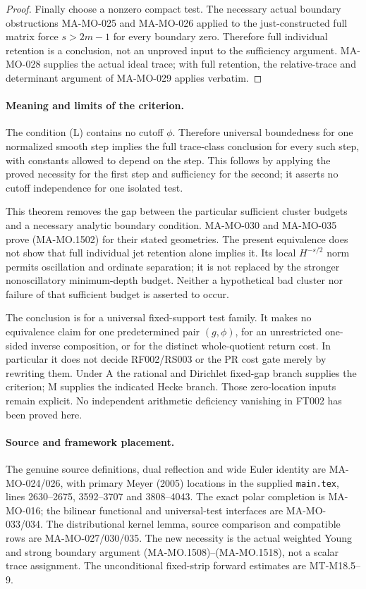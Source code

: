 \begin{proof}
Finally choose a nonzero compact test.  The necessary
actual boundary obstructions MA-MO-025 and MA-MO-026
applied to the just-constructed full matrix force
$s>2m-1$ for every boundary zero.  Therefore full individual
retention is a conclusion, not an unproved input to the
sufficiency argument.  MA-MO-028 supplies the actual ideal
trace; with full retention, the relative-trace and
determinant argument of MA-MO-029 applies verbatim.
\end{proof}

\paragraph{Meaning and limits of the criterion.}
The condition (L) contains no cutoff $\phi$.  Therefore universal
boundedness for one normalized smooth step implies the full
trace-class conclusion for every such step, with constants
allowed to depend on the step.  This follows by applying the
proved necessity for the first step and sufficiency for the
second; it asserts no cutoff independence for one isolated test.

This theorem removes the gap between the particular sufficient
cluster budgets and a necessary analytic boundary condition.
MA-MO-030 and MA-MO-035 prove (MA-MO.1502) for their stated
geometries.  The present equivalence does not show that full
individual jet retention alone implies it.  Its local
$H^{-s/2}$ norm permits oscillation and ordinate separation;
it is not replaced by the stronger nonoscillatory minimum-depth
budget.  Neither a hypothetical bad cluster nor failure of
that sufficient budget is asserted to occur.

The conclusion is for a universal fixed-support test family.
It makes no equivalence claim for one predetermined pair
$(g,\phi)$, for an unrestricted one-sided inverse composition,
or for the distinct whole-quotient return cost.  In particular
it does not decide RF002/RS003 or the PR cost gate merely by
rewriting them.  Under A the rational and Dirichlet fixed-gap
branch supplies the criterion; M supplies the indicated
Hecke branch.  Those zero-location inputs remain explicit.
No independent arithmetic deficiency vanishing in FT002
has been proved here.

\paragraph{Source and framework placement.}
The genuine source definitions, dual reflection and wide Euler
identity are MA-MO-024/026, with primary Meyer (2005) locations
in the supplied \texttt{main.tex}, lines 2630--2675,
3592--3707 and 3808--4043.  The exact polar completion is
MA-MO-016; the bilinear functional and universal-test
interfaces are MA-MO-033/034.  The distributional kernel
lemma, source comparison and compatible rows are
MA-MO-027/030/035.  The new necessity is the actual
weighted Young and strong boundary argument
(MA-MO.1508)--(MA-MO.1518), not a scalar trace assignment.
The unconditional fixed-strip forward estimates are
MT-M18.5--9.

